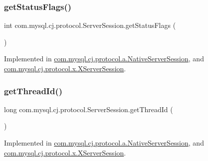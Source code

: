 \mbox{\label{interfacecom_1_1mysql_1_1cj_1_1protocol_1_1_server_session_a9cba9b511a27892b6e860172734c7d70}} 
\subsubsection{\texorpdfstring{get\+Status\+Flags()}{getStatusFlags()}}
{\footnotesize\ttfamily int com.\+mysql.\+cj.\+protocol.\+Server\+Session.\+get\+Status\+Flags (\begin{DoxyParamCaption}{ }\end{DoxyParamCaption})}



Implemented in \mbox{\hyperlink{classcom_1_1mysql_1_1cj_1_1protocol_1_1a_1_1_native_server_session_a3b8393e68e3bba53f8afafeb67ea4616}{com.\+mysql.\+cj.\+protocol.\+a.\+Native\+Server\+Session}}, and \mbox{\hyperlink{classcom_1_1mysql_1_1cj_1_1protocol_1_1x_1_1_x_server_session_a40482eb0bd6517855653665d70e5fd58}{com.\+mysql.\+cj.\+protocol.\+x.\+X\+Server\+Session}}.

\mbox{\label{interfacecom_1_1mysql_1_1cj_1_1protocol_1_1_server_session_aa0ebcb06b9b56f63662cedf8720a5505}} 
\subsubsection{\texorpdfstring{get\+Thread\+Id()}{getThreadId()}}
{\footnotesize\ttfamily long com.\+mysql.\+cj.\+protocol.\+Server\+Session.\+get\+Thread\+Id (\begin{DoxyParamCaption}{ }\end{DoxyParamCaption})}



Implemented in \mbox{\hyperlink{classcom_1_1mysql_1_1cj_1_1protocol_1_1a_1_1_native_server_session_a9de8131697ca7d13a9df02f60568137f}{com.\+mysql.\+cj.\+protocol.\+a.\+Native\+Server\+Session}}, and \mbox{\hyperlink{classcom_1_1mysql_1_1cj_1_1protocol_1_1x_1_1_x_server_session_adade76c5c1984674e31e277d46450123}{com.\+mysql.\+cj.\+protocol.\+x.\+X\+Server\+Session}}.

